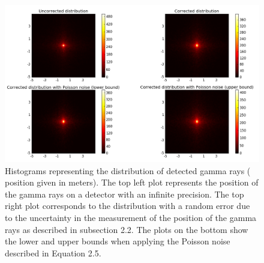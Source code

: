 \documentclass[10 pt]{article}
\numberwithin{equation}{section}
\begin{document}
\begin{figure}[H]
\includegraphics[width=\linewidth]{nuclear_experiment}
\caption{Histograms representing the distribution of detected gamma rays ( position given in meters). The top left plot represents the position of the gamma rays on a detector with an infinite precision. The top right plot corresponds to the distribution with a random error due to the uncertainty in the measurement of the position of the gamma rays as described in subsection 2.2. The plots on the bottom show the lower and upper bounds when applying the Poisson noise described in Equation 2.5.}
\end{figure}
\newpage
\end{document}
